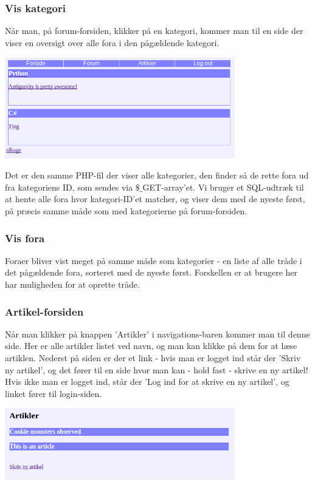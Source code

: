 \documentclass{article}
\begin{document}
\subsubsection{Vis kategori}
Når man, på forum-forsiden, klikker på en kategori, kommer man til en side der viser en oversigt over alle fora i den pågældende kategori. 

\includegraphics[width=100mm]{mi11.png}

Det er den samme PHP-fil der viser alle kategorier, den finder så de rette fora ud fra kategoriens ID, som sendes via $\$$$\_$GET-array'et. Vi bruger et SQL-udtræk til at hente alle fora hvor kategori-ID'et matcher, og viser dem med de nyeste først, på præcis samme måde som med kategorierne på forum-forsiden.

\subsubsection{Vis fora}
Foraer bliver vist meget på samme måde som kategorier - en liste af alle tråde i det pågældende fora, sorteret med de nyeste først. Forskellen er at brugere her har muligheden for at oprette tråde.

\subsubsection{Artikel-forsiden}
Når man klikker på knappen 'Artikler' i navigations-baren kommer man til denne side. Her er alle artikler listet ved navn, og man kan klikke på dem for at læse artiklen. Nederst på siden er der et link - hvis man er logget ind står der 'Skriv ny artikel', og det fører til en side hvor man kan - hold fast - skrive en ny artikel! Hvis ikke man er logget ind, står der 'Log ind for at skrive en ny artikel', og linket fører til login-siden.

\includegraphics[width=100mm]{mi05.png}
\end{document}
